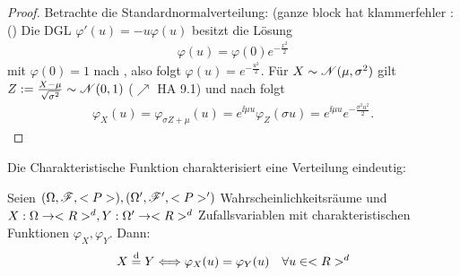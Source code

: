 \begin{proof}
	Betrachte die Standardnormalverteilung:
	(ganze block hat klammerfehler :()
	Die DGL $\varphi'(u) = -u\varphi(u)$ besitzt die Lösung
	\begin{align*}
		\varphi(u) = \varphi(0)e^{-\frac{x^2}{2}}
	\end{align*}
	mit $\varphi(0) =1$ nach , also folgt $\varphi(u) = e^{-\frac{u^2}{2}}$. Für $X \sim \mathscr N(\mu, \sigma^2)$ gilt $Z:= \frac{X-\mu}{\sqrt{\sigma^2}} \sim \mathscr N(0,1)$ ($\nearrow$ HA 9.1) und nach  folgt
	\begin{align*}
		\varphi_X(u) = \varphi_{\sigma Z + \mu} (u) = e^{\ii \mu u}\varphi_Z (\sigma u) = e^{\ii \mu  u}e^{-\frac{\sigma^2 u^2}{2}}.
	\end{align*}
\end{proof}
Die Charakteristische Funktion charakterisiert eine Verteilung eindeutig:
\begin{proposition}
	 Seien $(\Omega,\mathscr F,<P>), (\Omega',\mathscr F',<P>')$ Wahrscheinlichkeitsräume und $X: \Omega \to <R>^d, Y: \Omega' \to <R>^d$ Zufallsvariablen mit charakteristischen Funktionen $\varphi_X, \varphi_Y$. Dann:
	\begin{align*}
		X \overset{\text{d}}{=} Y \Longleftrightarrow \varphi_X(u) = \varphi_Y(u) \quad \forall u \in <R>^d
	\end{align*}
\end{proposition}
